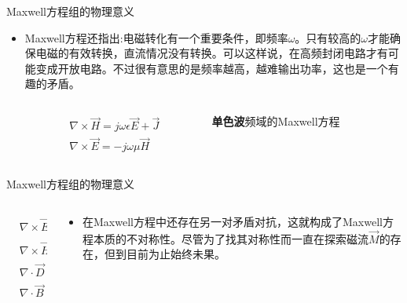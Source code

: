 \documentclass{ctexbeamer}
\begin{document}
\begin{frame}{Maxwell方程组的物理意义}
\begin{itemize}
  \item Maxwell方程还指出:电磁转化有一个重要条件，即频率$\omega$。只有较高的$\omega$才能确保电磁的有效转换，直流情况没有转换。可以这样说，在高频封闭电路才有可能变成开放电路。不过很有意思的是频率越高，越难输出功率，这也是一个有趣的矛盾。
  \begin{columns}
    \begin{column}{0.4\linewidth}
      \begin{align*}
        & \nabla\times\vec{H} = j\omega\epsilon\vec{E}+\vec{J}\\
        & \nabla\times\vec{E} = -j\omega\mu\vec{H}
      \end{align*}
    \end{column}
    \begin{column}{0.6\linewidth}
      \textbf{单色波}频域的Maxwell方程
    \end{column}
  \end{columns}
\end{itemize}
\end{frame}

\begin{frame}{Maxwell方程组的物理意义}
  \begin{columns}
    \begin{column}{0.4\linewidth}
      \begin{align*}
        &\nabla\times\vec E=-\frac{\partial \vec B}{\partial t}\\
        &\nabla\times\vec H=\vec{J} +\frac{\partial \vec D}{\partial t}\\
        &\nabla\cdot\vec{D}=\rho\\
        &\nabla\cdot\vec{B}=0
      \end{align*}
    \end{column}
    \begin{column}{0.65\linewidth}
      \begin{itemize}
        \item 在Maxwell方程中还存在另一对矛盾对抗，这就构成了Maxwell方程本质的不对称性。尽管为了找其对称性而一直在探索磁流$\vec{M}$的存在，但到目前为止始终未果。
      \end{itemize}
    \end{column}
  \end{columns}
\end{frame}
\end{document}
